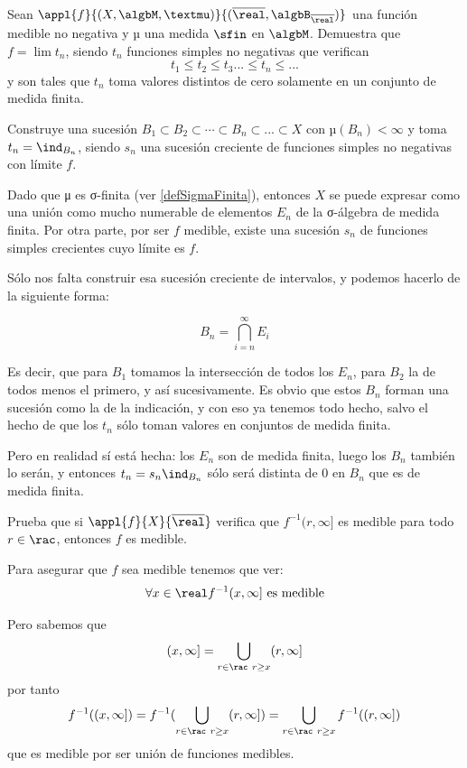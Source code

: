 \begin{problem}[3]
Sean $\appl{f}{(X, \algbM, µ)}{(\overline{\real}, \algbB_{\overline{\real}})}$ una función medible no negativa y µ una medida $\sfin$ en $\algbM$. Demuestra que $f= \lim t_n$, siendo $t_n$ funciones simples no negativas que verifican
\[t_1 \leq t_2 \leq t_3 ...\leq t_n \leq ...\]
y son tales que $t_n$ toma valores distintos de cero solamente en un conjunto de medida finita.

\obs Construye una sucesión $B_1 \subset B_2 \subset \dotsb \subset B_n \subset ... \subset X$ con $µ(B_n)<\infty$ y toma $t_n=\ind_{B_n}$, siendo $s_n$ una sucesión creciente de funciones simples no negativas con límite $f$.
\solution

Dado que μ es σ-finita (ver \ref{defSigmaFinita}), entonces $X$ se puede expresar como una unión como mucho numerable de elementos $E_n$ de la σ-álgebra de medida finita. Por otra parte, por ser $f$ medible, existe una sucesión $s_n$ de funciones simples crecientes cuyo límite es $f$.

Sólo nos falta construir esa sucesión creciente de intervalos, y podemos hacerlo de la siguiente forma:

\[ B_n = \bigcap_{i=n}^{∞} E_i \]

Es decir, que para $B_1$ tomamos la intersección de todos los $E_n$, para $B_2$ la de todos menos el primero, y así sucesivamente. Es obvio que estos $B_n$ forman una sucesión como la de la indicación, y con eso ya tenemos todo hecho, salvo el hecho de que los $t_n$ sólo toman valores en conjuntos de medida finita.

Pero en realidad sí está hecha: los $E_n$ son de medida finita, luego los $B_n$ también lo serán, y entonces $t_n = s_n \ind_{B_n}$ sólo será distinta de $0$ en $B_n$ que es de medida finita.

\end{problem}

\begin{problem}[4]
Prueba que si $\appl{f}{X}{\overline{\real}}$ verifica que $f^{-1}(r, \infty]$ es medible para todo $r\in\rac$, entonces $f$ es medible.

\solution
Para asegurar que $f$ sea medible tenemos que ver:
\[\forall x \in \real f^{-1}(x, \infty] \text{ es medible}\]

Pero sabemos que
\[(x, \infty] = \bigcup_{r \in \rac \ r \geq x}(r, \infty]\]
por tanto
\[f^{-1}((x, \infty]) = f^{-1}(\bigcup_{r \in \rac \ r \geq x}(r, \infty]) = \bigcup_{r \in \rac \ r \geq x} f^{-1}((r, \infty])\]
que es medible por ser unión de funciones medibles.

\end{problem}

